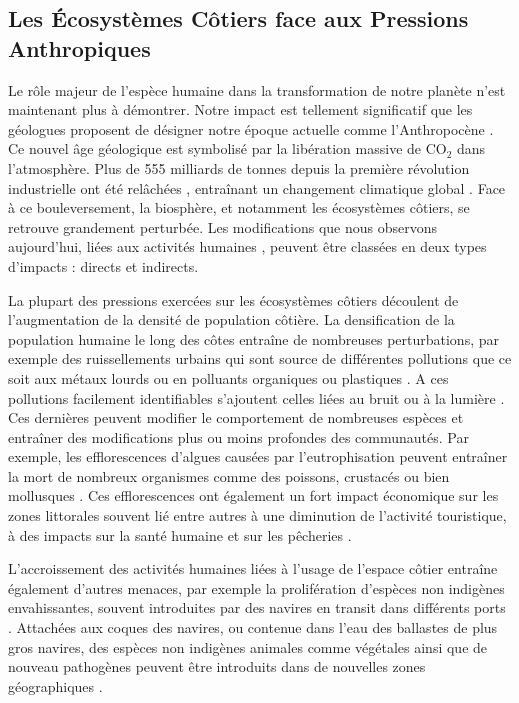 \begin{refsection}
\hypertarget{les-uxe9cosystuxe8mes-cuxf4tiers-face-aux-pressions-anthropiques}{%
\subsection{Les Écosystèmes Côtiers face aux Pressions
Anthropiques}\label{les-uxe9cosystuxe8mes-cuxf4tiers-face-aux-pressions-anthropiques}}

Le rôle majeur de l'espèce humaine dans la transformation de notre
planète n'est maintenant plus à démontrer. Notre impact est tellement
significatif que les géologues proposent de désigner notre époque
actuelle comme l'Anthropocène \autocite{Subramanian_2019}. Ce nouvel âge
géologique est symbolisé par la libération massive de CO\(_2\) dans
l'atmosphère. Plus de 555 milliards de tonnes depuis la première
révolution industrielle ont été relâchées \autocite{Lewis_2015},
entraînant un changement climatique global \autocite{Calvin_2023}. Face
à ce bouleversement, la biosphère, et notamment les écosystèmes côtiers,
se retrouve grandement perturbée. Les modifications que nous observons
aujourd'hui, liées aux activités humaines \autocite{Calvin_2023},
peuvent être classées en deux types d'impacts : directs et indirects.

La plupart des pressions exercées sur les écosystèmes côtiers découlent
de l'augmentation de la densité de population côtière. La densification
de la population humaine le long des côtes entraîne de nombreuses
perturbations, par exemple des ruissellements urbains qui sont source de
différentes pollutions que ce soit aux métaux lourds ou en polluants
organiques ou plastiques \autocite{Todd_2019}. A ces pollutions
facilement identifiables s'ajoutent celles liées au bruit ou à la
lumière \autocite{Todd_2019}. Ces dernières peuvent modifier le
comportement de nombreuses espèces \autocite{Todd_2019} et entraîner des
modifications plus ou moins profondes des communautés. Par exemple, les
efflorescences d'algues causées par l'eutrophisation peuvent entraîner
la mort de nombreux organismes comme des poissons, crustacés ou bien
mollusques \autocite{Todd_2019}. Ces efflorescences ont également un
fort impact économique sur les zones littorales souvent lié entre autres
à une diminution de l'activité touristique, à des impacts sur la santé
humaine et sur les pêcheries \autocite{EuropeanCommission_2016}.

L'accroissement des activités humaines liées à l'usage de l'espace
côtier entraîne également d'autres menaces, par exemple la prolifération
d'espèces non indigènes envahissantes, souvent introduites par des
navires en transit dans différents ports \autocite{Hardiman_2010}.
Attachées aux coques des navires, ou contenue dans l'eau des ballastes
de plus gros navires, des espèces non indigènes animales comme végétales
ainsi que de nouveau pathogènes peuvent être introduits dans de
nouvelles zones géographiques \autocite{Hardiman_2010}.


\end{refsection}
